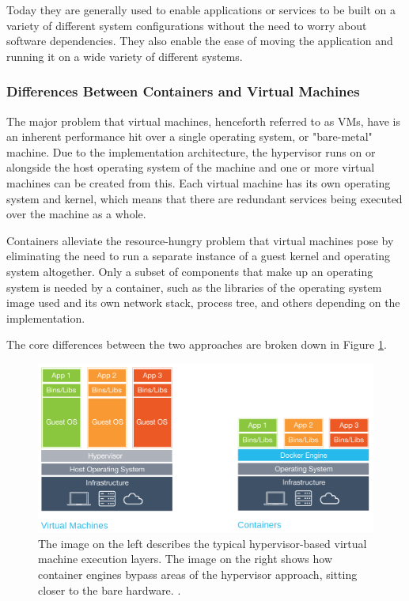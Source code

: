 Today they are generally used to enable applications or services to be built on a variety of different system configurations without the need to worry about software dependencies. They also enable the ease of moving the application and running it on a wide variety of different systems.

\subsubsection{Differences Between Containers and Virtual Machines}

The major problem that virtual machines, henceforth referred to as VMs, have is an inherent performance hit over a single operating system, or "bare-metal" machine. Due to the implementation architecture, the hypervisor runs on or alongside the host operating system of the machine and one or more virtual machines can be created from this. Each virtual machine has its own operating system and kernel, which means that there are redundant services being executed over the machine as a whole.

Containers alleviate the resource-hungry problem that virtual machines pose by eliminating the need to run a separate instance of a guest kernel and operating system altogether. Only a subset of components that make up an operating system is needed by a container, such as the libraries of the operating system image used and its own network stack, process tree, and others depending on the implementation.

The core differences between the two approaches are broken down in Figure \ref{fig:hypecont_diff}.


\begin{figure}[h!]
\centering
\includegraphics[width=\textwidth]{Figures/hypervisor_vs_container.png}
\decoRule
\caption[Differences between Hypervisors and Containers]{The image on the left describes the typical hypervisor-based virtual machine execution layers. The image on the right shows how container engines bypass areas of the hypervisor approach, sitting closer to the bare hardware. \parencite{enterprise_hypercont_diff}.}
\label{fig:hypecont_diff}
\end{figure}


